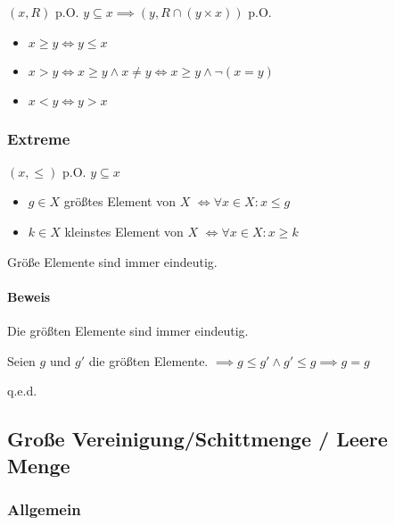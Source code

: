\documentclass[12pt]{scrreprt}
\newcommand{\qed}{\begin{flushright}q.e.d.\end{flushright}}
\begin{document}
                    $ (x, R) $ p.O. $ y \subseteq x \implies (y, R \cap (y \times x)) $ p.O.

                    \begin{itemize}
                        \item $ x \geq y \iff y \leq x $
                        \item $ x > y \iff x \geq y \land x \neq y \iff x \geq y \land \lnot (x = y) $
                        \item $ x < y \iff y > x $
                    \end{itemize}


                \subsubsection{Extreme}
                    \label{sss:grundbegriffe_mengen_ordnungensrelationen_extreme}

                    $ (x, \leq) $ p.O. $ y \subseteq x $

                    \begin{itemize}
                        \item $ g \in X $ größtes Element von $ X $ $ \iff \forall x \in X : x \leq g $
                        \item $ k \in X $ kleinstes Element von $ X $ $ \iff \forall x \in X : x \geq k $
                    \end{itemize}

                    Größe Elemente sind immer eindeutig.

                    \paragraph{Beweis}
                        Die größten Elemente sind immer eindeutig.

                        Seien $ g $ und $ g' $ die größten Elemente.
                        $ \implies g \leq g' \land g' \leq g \implies g = g $

                        \qed


            \subsection{Große Vereinigung/Schittmenge / Leere Menge}
                \label{ss:grundbegriffe_mengen_grosseVerSchn}

                \subsubsection{Allgemein}
\end{document}
